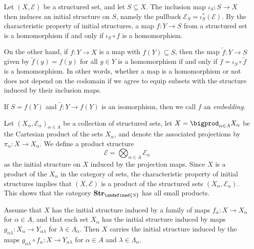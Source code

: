 \documentclass[article, a4paper, 11pt, oneside]{memoir}
\let\mathfrak\undefined
\numberwithin{equation}{chapter}
\newcommand{\calE}{\mathcal{E}}
\newcommand{\strucS}{\mathfrak{S}}
\newcommand{\ncat}[1]{\mathbf{#1}} %
\newcommand{\catStruc}[1]{\ncat{Str}_{#1}} %
\newcommand{\catStrucS}{\catStruc{\strucS}} %
\begin{document}
\begin{examplebreak}[Subsets]
    \label{ex:subset_structure}
    Let $(X,\calE)$ be a structured set, and let $S \subseteq X$. The inclusion map $\iota_S \colon S \to X$ then induces an initial structure on $S$, namely the pullback $\calE_S = \iota_S^*(\calE)$. By the characteristic property of initial structures, a map $f \colon Y \to S$ from a structured set is a homomorphism if and only if $\iota_S \circ f$ is a homomorphism.

    On the other hand, if $f \colon Y \to X$ is a map with $f(Y) \subseteq S$, then the map $\tilde f \colon Y \to S$ given by $\tilde f(y) = f(y)$ for all $y \in Y$ is a homomorphism if and only if $f = \iota_S \circ \tilde f$ is a homomorphism. In other words, whether a map is a homomorphism or not does not depend on the codomain if we agree to equip subsets with the structure induced by their inclusion maps.

    If $S = f(Y)$ and $\tilde f \colon Y \to f(Y)$ is an isomorphism, then we call $f$ an \emph{embedding}.
\end{examplebreak}

\begin{examplebreak}[Products]
    Let $(X_\alpha, \calE_\alpha)_{\alpha \in A}$ be a collection of structured sets, let $X = \bigprod_{\alpha \in A} X_\alpha$ be the Cartesian product of the sets $X_\alpha$, and denote the associated projections by $\pi_\alpha \colon X \to X_\alpha$. We define a product structure
    \begin{equation*}
        \calE = \bigotimes_{\alpha \in A} \calE_\alpha
    \end{equation*}
    as the initial structure on $X$ induced by the projection maps. Since $X$ is a product of the $X_\alpha$ in the category of sets, the characteristic property of initial structures implies that $(X,\calE)$ is a product of the structured sets $(X_\alpha,\calE_\alpha)$. This shows that the category $\catStrucS$ has all small products.
\end{examplebreak}


\begin{proposition}
    Assume that $X$ has the initial structure induced by a family of maps $f_\alpha \colon X \to X_\alpha$ for $\alpha \in A$, and that each set $X_\alpha$ has the initial structure induced by maps $g_{\alpha\lambda} \colon X_\alpha \to Y_{\alpha\lambda}$ for $\lambda \in \Lambda_\alpha$. Then $X$ carries the initial structure induced by the maps $g_{\alpha\lambda} \circ f_\alpha \colon X \to Y_{\alpha\lambda}$ for $\alpha \in A$ and $\lambda \in \Lambda_\alpha$.
\end{proposition}
\end{document}
